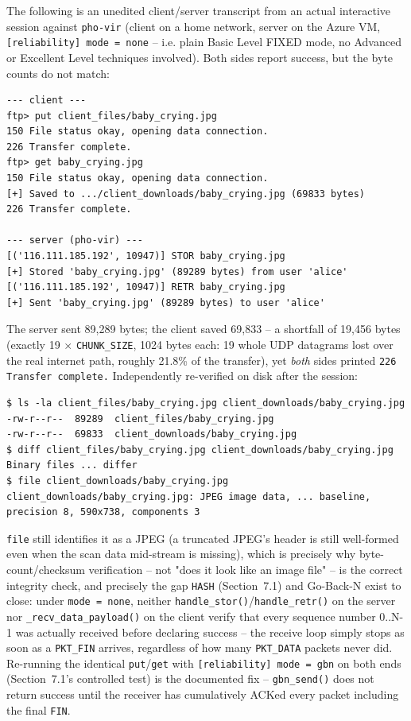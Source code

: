 \documentclass[11pt]{article}
\begin{document}
The following is an unedited client/server transcript from an actual interactive
session against \texttt{pho-vir} (client on a home network, server on the Azure VM,
\texttt{[reliability] mode = none} -- i.e. plain Basic Level FIXED mode, no Advanced
or Excellent Level techniques involved). Both sides report success, but the byte
counts do not match:

\begin{lstlisting}
--- client ---
ftp> put client_files/baby_crying.jpg
150 File status okay, opening data connection.
226 Transfer complete.
ftp> get baby_crying.jpg
150 File status okay, opening data connection.
[+] Saved to .../client_downloads/baby_crying.jpg (69833 bytes)
226 Transfer complete.

--- server (pho-vir) ---
[('116.111.185.192', 10947)] STOR baby_crying.jpg
[+] Stored 'baby_crying.jpg' (89289 bytes) from user 'alice'
[('116.111.185.192', 10947)] RETR baby_crying.jpg
[+] Sent 'baby_crying.jpg' (89289 bytes) to user 'alice'
\end{lstlisting}

The server sent 89{,}289 bytes; the client saved 69{,}833 -- a shortfall of
19{,}456 bytes (exactly 19 $\times$ \texttt{CHUNK\_SIZE}, 1024 bytes each: 19 whole
UDP datagrams lost over the real internet path, roughly 21.8\% of the transfer),
yet \emph{both} sides printed \texttt{226 Transfer complete.} Independently
re-verified on disk after the session:
\begin{lstlisting}
$ ls -la client_files/baby_crying.jpg client_downloads/baby_crying.jpg
-rw-r--r--  89289  client_files/baby_crying.jpg
-rw-r--r--  69833  client_downloads/baby_crying.jpg
$ diff client_files/baby_crying.jpg client_downloads/baby_crying.jpg
Binary files ... differ
$ file client_downloads/baby_crying.jpg
client_downloads/baby_crying.jpg: JPEG image data, ... baseline, precision 8, 590x738, components 3
\end{lstlisting}
\texttt{file} still identifies it as a JPEG (a truncated JPEG's header is still
well-formed even when the scan data mid-stream is missing), which is precisely
why byte-count/checksum verification -- not "does it look like an image file" --
is the correct integrity check, and precisely the gap \texttt{HASH}
(Section~7.1) and Go-Back-N exist to close: under \texttt{mode = none}, neither
\texttt{handle\_stor()}/\texttt{handle\_retr()} on the server nor
\texttt{\_recv\_data\_payload()} on the client verify that every sequence number
0..N-1 was actually received before declaring success -- the receive loop simply
stops as soon as a \texttt{PKT\_FIN} arrives, regardless of how many
\texttt{PKT\_DATA} packets never did. Re-running the identical \texttt{put}/\texttt{get}
with \texttt{[reliability] mode = gbn} on both ends (Section~7.1's controlled test)
is the documented fix -- \texttt{gbn\_send()} does not return success until the
receiver has cumulatively ACKed every packet including the final \texttt{FIN}.
\end{document}
